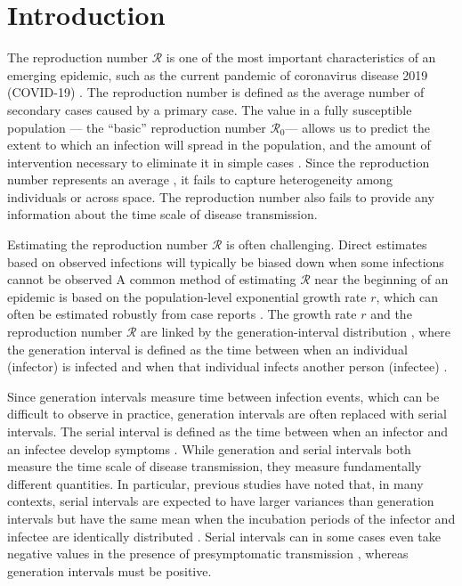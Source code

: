 \documentclass[12pt]{article}
\newcommand{\Rx}[1]{\ensuremath{{\mathcal R}_{#1}}\xspace}
\newcommand{\Ro}{\Rx{0}}
\newcommand{\RR}{\ensuremath{{\mathcal R}}\xspace}
\begin{document}
\pagebreak

\section{Introduction}

The reproduction number \RR is one of the most important characteristics of an emerging epidemic, such as the current pandemic of coronavirus disease 2019 (COVID-19) \citep{majumder2020early}.
The reproduction number is defined as the average number of secondary cases caused by a primary case.
The value in a fully susceptible population --- the ``basic'' reproduction number \Ro --- allows us to predict the extent to which an infection will spread in the population, and the amount of intervention necessary to eliminate it in simple cases \citep{anderson1991infectious}.
Since the reproduction number represents an average \citep{diekmann1990definition, anderson1991infectious}, it fails to capture heterogeneity among individuals or across space.
The reproduction number also fails to provide any information about the time scale of disease transmission.

Estimating the reproduction number \RR is often challenging.
Direct estimates based on observed infections will typically be biased down when some infections cannot be observed
A common method of estimating \RR near the beginning of an epidemic is based on the population-level exponential growth rate $r$, which can often be estimated robustly from case reports \citep{mills2004transmissibility, ma2014estimating}.
The growth rate $r$ and the reproduction number \RR are linked by the generation-interval distribution \cite{wallinga2007generation}, where the generation interval is defined as the time between when an individual (infector) is infected and when that individual infects another person (infectee) \citep{svensson2007note}.

Since generation intervals measure time between infection events, which can be difficult to observe in practice, generation intervals are often replaced with serial intervals.
The serial interval is defined as the time between when an infector and an infectee develop symptoms \citep{svensson2007note}.
While generation and serial intervals both measure the time scale of disease transmission, they measure fundamentally different quantities. 
In particular, previous studies have noted that, in many contexts, serial intervals are expected to have larger variances than generation intervals but have the same mean when the incubation periods of the infector and infectee are identically distributed \citep{svensson2007note,klinkenberg2011correlation,te2013estimating,champredon2018equivalence}.
Serial intervals can in some cases even take negative values in the presence of presymptomatic transmission \citep{he2020temporal}, whereas generation intervals must be positive.
\end{document}
